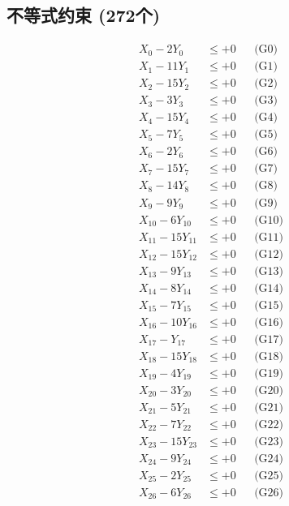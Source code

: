 \documentclass[a4paper,10pt]{article}
\begin{document}
\subsection{不等式约束 (272个)}

\allowdisplaybreaks
{\small
\begin{align}
\allowbreak
X_{0} - 2Y_{0} &\leq +0 && \text{(G0)} \\
X_{1} - 11Y_{1} &\leq +0 && \text{(G1)} \\
X_{2} - 15Y_{2} &\leq +0 && \text{(G2)} \\
X_{3} - 3Y_{3} &\leq +0 && \text{(G3)} \\
\allowbreak
X_{4} - 15Y_{4} &\leq +0 && \text{(G4)} \\
X_{5} - 7Y_{5} &\leq +0 && \text{(G5)} \\
X_{6} - 2Y_{6} &\leq +0 && \text{(G6)} \\
X_{7} - 15Y_{7} &\leq +0 && \text{(G7)} \\
X_{8} - 14Y_{8} &\leq +0 && \text{(G8)} \\
X_{9} - 9Y_{9} &\leq +0 && \text{(G9)} \\
X_{10} - 6Y_{10} &\leq +0 && \text{(G10)} \\
X_{11} - 15Y_{11} &\leq +0 && \text{(G11)} \\
X_{12} - 15Y_{12} &\leq +0 && \text{(G12)} \\
X_{13} - 9Y_{13} &\leq +0 && \text{(G13)} \\
\allowbreak
X_{14} - 8Y_{14} &\leq +0 && \text{(G14)} \\
X_{15} - 7Y_{15} &\leq +0 && \text{(G15)} \\
X_{16} - 10Y_{16} &\leq +0 && \text{(G16)} \\
X_{17} - Y_{17} &\leq +0 && \text{(G17)} \\
X_{18} - 15Y_{18} &\leq +0 && \text{(G18)} \\
X_{19} - 4Y_{19} &\leq +0 && \text{(G19)} \\
X_{20} - 3Y_{20} &\leq +0 && \text{(G20)} \\
X_{21} - 5Y_{21} &\leq +0 && \text{(G21)} \\
X_{22} - 7Y_{22} &\leq +0 && \text{(G22)} \\
X_{23} - 15Y_{23} &\leq +0 && \text{(G23)} \\
\allowbreak
X_{24} - 9Y_{24} &\leq +0 && \text{(G24)} \\
X_{25} - 2Y_{25} &\leq +0 && \text{(G25)} \\
X_{26} - 6Y_{26} &\leq +0 && \text{(G26)} \\

\end{align}}
\end{document}
